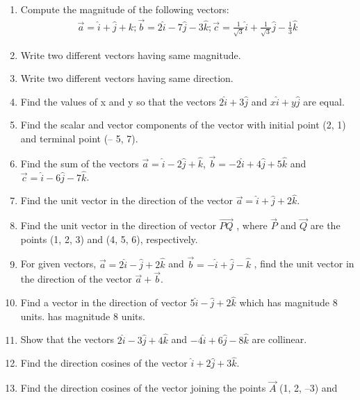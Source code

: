 \begin{enumerate}[label=\thesection.\arabic*,ref=\thesection.\theenumi]
\item Compute the magnitude of the following vectors:
\begin{align*}
\vec{a}=\hat{i}+\hat{j}+k; \vec{b}=2\hat{i}-7\hat{j}-3\hat{k}; \vec{c}=\frac{1}{\sqrt{3}}\hat{i}+\frac{1}{\sqrt{3}}\hat{j}-\frac{1}{3}\hat{k}
\end{align*}
    \solution 
		
\item Write two different vectors having same magnitude.
\item Write two different vectors having same direction.
\item Find the values of x and y so that the vectors $2\hat{i}+3\hat{j}$ and $x\hat{i}+y\hat{j}$ are equal.
\item Find the scalar and vector components of the vector with initial point (2, 1) and
terminal point (– 5, 7).
\item Find the sum of the vectors $\vec{a}=\hat{i}-2\hat{j}+\hat{k}$, $\vec{b}=-2\hat{i}+4\hat{j}+5\hat{k}$ and $\vec{c}=\hat{i}-6\hat{j}-7\hat{k}$.
\item Find the unit vector in the direction of the vector $\vec{a}=\hat{i}+\hat{j}+2\hat{k}$.
\item Find the unit vector in the direction of vector $\overrightarrow{PQ}$ , where $\vec{P}$ and $\vec{Q}$ are the points
(1, 2, 3) and (4, 5, 6), respectively.
\item For given vectors, $\vec{a}=2\hat{i}-\hat{j}+2\hat{k}$ and $\vec{b}=-\hat{i}+\hat{j}-\hat{k}$ , find the unit vector in the
direction of the vector $\vec{a}+\vec{b}$.
\\
    \solution 
		
\item Find a vector in the direction of vector $5\hat{i}-\hat{j}+2\hat{k}$ which has magnitude 8 units.
    has magnitude 8 units.
   \\ 
    \solution 
		
\item Show that the vectors $2\hat{i}-3\hat{j}+4\hat{k}$ and $-4\hat{i}+6\hat{j}-8\hat{k}$ are collinear.
   \\ 
    \solution 
		
\item Find the direction cosines of the vector $\hat{i}+2\hat{j}+3\hat{k}$.
	\\
    \solution 
		
\item Find the direction cosines of the vector joining the points $\vec{A}$ (1, 2, –3) and

\end{enumerate}
